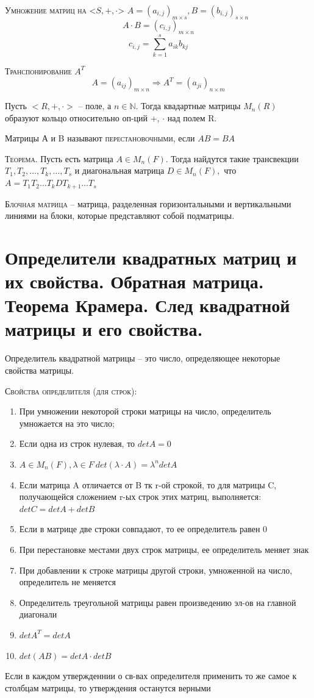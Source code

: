 \documentclass{article}
\begin{document}
\textsc{Умножение матриц на {<$S, +, \cdot$>}} $A=(a_{i,j})_{m\times s}, B=(b_{i,j})_{s\times n}$
$$A\cdot B=(c_{i,j})_{m\times n}$$
$$c_{i,j}=\sum_{k=1}^{s} a_{ik}b_{kj}$$

\textsc{Транспонирование $A^T$}
$$A=(a_{ij})_{m\times n}\Rightarrow A^T=(a_{ji})_{n\times m}$$

Пусть $<R, +, \cdot>$ – поле, а $n\in \mathbb{N}$. Тогда квадартные матрицы $M_n(R)$ образуют кольцо относительно оп-ций +, $\cdot$ над полем R.

Матрицы А и B называют \textsc{перестановочными}, если $AB=BA$

\textsc{Теорема.} Пусть есть матрица $A\in M_n(F)$. Тогда найдутся такие трансвекции $T_1,T_2,\dots,T_k,\dots,T_s$ и диагональная матрица 
$D\in M_n(F),$ что $A=T_1T_2\dots T_kDT_{k+1}\dots T_s$

\textsc{Блочная матрица} – матрица, разделенная горизонтальными и вертикальными линиями на блоки, которые представляют собой подматрицы.

\section{Определители квадратных матриц и их свойства. Обратная матрица. Теорема Крамера. След квадратной матрицы и его свойства.}
Определитель квадратной матрицы – это число, определяющее некоторые свойства матрицы.

\textsc{Свойства определителя (для строк):}
\begin{enumerate}
    \item При умножении некоторой строки матрицы на число, определитель умножается на это число;
    \item Если одна из строк нулевая, то $det A=0$
    \item $A\in M_n(F), \lambda \in F \ det(\lambda\cdot A)=\lambda^ndet A$
    \item Если матрица A отличается от B тк r-ой строкой, то для матрицы C, получающейся сложением r-ых строк этих матриц, выполняется: $det C=det A+det B$
    \item Если в матрице две строки совпадают, то ее определитель равен 0
    \item При перестановке местами двух строк матрицы, ее определитель меняет знак
    \item При добавлении к строке матрицы другой строки, умноженной на число, определитель не меняется
    \item Определитель треугольной матрицы равен произведению эл-ов на главной диагонали
    \item $det A^T=det A$
    \item $det(AB)=det A\cdot det B$
\end{enumerate}
Если в каждом утвержденнии о св-вах определителя применить то же самое к столбцам матрицы, то утверждения останутся верными
\end{document}
